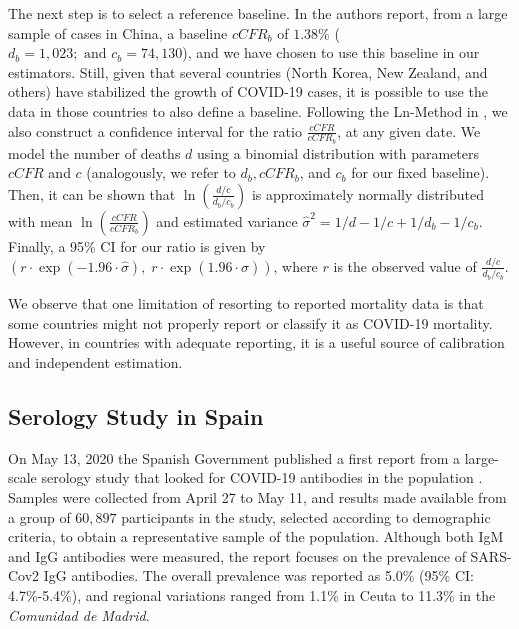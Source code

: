 \documentclass[sigconf]{acmart}
\newcommand{\af}[1]{{#1}}
\newcommand{\cb}[1]{{#1}}
\newcommand{\hh}[1]{{#1}}
\begin{document}
\cb{The next step is to select a reference baseline}. In \cite{Verity2020} the authors report, from a large sample of cases in China, a baseline $\textit{cCFR}_b$ of $1.38\%$ \hh{($d_b = 1,023; \mbox{ and } c_b = 74,130$)}, \cb{and we have chosen to use this baseline in our estimators.} Still, given that several countries (North Korea, New Zealand, and others) have stabilized the growth of COVID-19 cases, it is possible to use the data in those countries to also define a baseline.
%
\hh{Following the Ln-Method in \cite{10.2307/2531405}, we also construct a confidence interval for the ratio $\frac{\textit{cCFR}}{\textit{cCFR}_b}$, at any given date. We model the number of deaths $d$ using a binomial distribution with parameters $\textit{cCFR}$ and $c$ (analogously, we refer to $d_b, \textit{cCFR}_b$, and $c_b$ for our fixed baseline). Then, it can be shown that $\ln \left( \frac{d/c}{d_b/c_b} \right) $ is approximately normally distributed with mean $\ln \left( \frac{\textit{cCFR}}{\textit{cCFR}_b} \right)$ and estimated variance $\hat{\sigma}^2=1/d-1/c+1/d_b-1/c_b$. Finally, a 95\% CI for our ratio is given by $\left( r \cdot \exp(-1.96 \cdot \hat \sigma ),\; r \cdot \exp(1.96 \cdot \hat \sigma ) \right)$, where $r$ is the observed value of $\frac{d/c}{d_b/c_b}$. }

We observe that one limitation of resorting to reported mortality data is that some countries might not properly report or classify it as COVID-19 mortality. However, in countries with adequate reporting, it is a useful source of calibration and independent estimation.



\subsection{Serology Study in Spain}

On May 13, 2020 the Spanish Government published a first report from a large-scale serology study that looked for COVID-19 antibodies in the population \cite{ENEcovid19}. Samples were collected from April 27 to May 11, and results made available from a group of $60,897$ participants in the study, selected according to demographic criteria, to obtain a representative sample of the population. Although both IgM and IgG antibodies were measured, the report focuses on the prevalence of  SARS-Cov2 IgG antibodies. The overall prevalence was reported as 5.0\% (95\% CI: 4.7\%-5.4\%), and regional variations ranged from 1.1\% in Ceuta to 11.3\% in the \emph{Comunidad de Madrid}.
\end{document}
